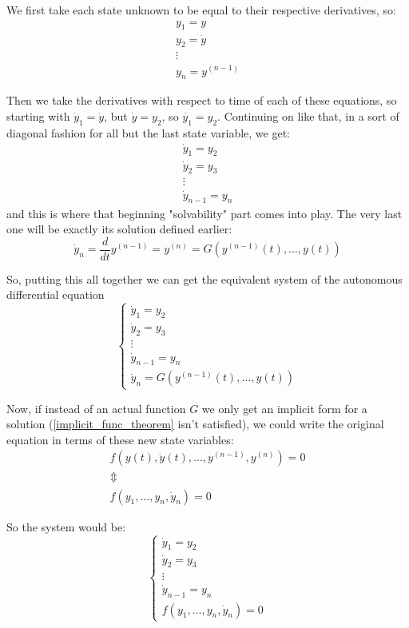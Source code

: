 We first take each state unknown to be equal to their respective derivatives, so:
\begin{gather*}
				y_1 = y     \\
				y_2 = \dot{y} \\
				\vdots \\
				y_n = y^{(n-1)}
\end{gather*}

Then we take the derivatives with respect to time of each of these equations, so starting with $\dot{y}_1 = \dot{y}$, but $\dot{y} = y_2$, so $\dot{y_1}=y_2$. Continuing on like that, in a sort of diagonal fashion for all but the last state variable, we get:
\begin{gather*}
				\dot{y}_1 = y_2 \\
				\dot{y}_2 = y_3 \\
				\vdots \\
				\dot{y}_{n-1} = y_n
\end{gather*}
and this is where that beginning "solvability" part comes into play. The very last one will be exactly its solution defined earlier:
\[
				\dot{y}_n = \frac{d}{dt}y^{(n-1)} = y^{(n)}  = G(y^{(n-1)}(t), \dots, y(t))
\]

So, putting this all together we can get the equivalent system of the autonomous differential equation
\[
				\begin{cases}
								\dot{y}_1 = y_2     \\
								\dot{y}_2 = y_3     \\
								\vdots              \\
								\dot{y}_{n-1} = y_n \\
								\dot{y}_n  = G(y^{(n-1)}(t), \dots, y(t))
				\end{cases}
\]

Now, if instead of an actual function $G$ we only get an implicit form for a solution (\ref{implicit_func_theorem} isn't satisfied), we could write the original equation in terms of these new state variables:
\begin{gather*}
				f(y(t), \dot{y}(t),\dots,y^{(n-1)},y^{(n)})= 0 \\
				\Updownarrow \\
				f(y_1,\dots,y_n,\dot{y}_n) = 0
\end{gather*}

So the system would be:
\[
				\begin{cases}
								\dot{y}_1 = y_2     \\
								\dot{y}_2 = y_3     \\
								\vdots              \\
								\dot{y}_{n-1} = y_n \\
								f(y_1,\dots,y_n,\dot{y}_n) = 0
				\end{cases}
\]

